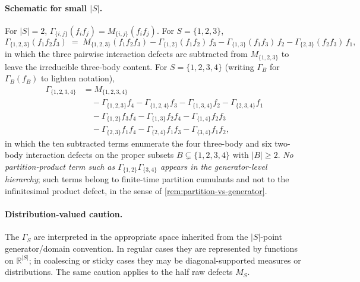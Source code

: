 \documentclass[11pt,reqno]{amsart}
\theoremstyle{plain}
\theoremstyle{definition}
\theoremstyle{remark}
\newcommand{\R}{\mathbb{R}}
\begin{document}
\paragraph{Schematic for small $|S|$.}
For $|S|=2$, $\Gamma_{\{i,j\}}(f_if_j)=M_{\{i,j\}}(f_if_j)$. For
$S=\{1,2,3\}$,
\begin{equation}\label{eq:gamma-3}
  \Gamma_{\{1,2,3\}}(f_1f_2f_3)
  \;=\;
  M_{\{1,2,3\}}(f_1f_2f_3)
  -\Gamma_{\{1,2\}}(f_1f_2)\,f_3
  -\Gamma_{\{1,3\}}(f_1f_3)\,f_2
  -\Gamma_{\{2,3\}}(f_2f_3)\,f_1,
\end{equation}
in which the three pairwise interaction defects are subtracted from
$M_{\{1,2,3\}}$ to leave the irreducible three-body content. For
$S=\{1,2,3,4\}$ (writing $\Gamma_B$ for $\Gamma_B(f_B)$ to lighten
notation),
\begin{equation}\label{eq:gamma-4}
\begin{aligned}
\Gamma_{\{1,2,3,4\}}
&=
M_{\{1,2,3,4\}}\\
&\quad
-\Gamma_{\{1,2,3\}}f_4-\Gamma_{\{1,2,4\}}f_3-\Gamma_{\{1,3,4\}}f_2-\Gamma_{\{2,3,4\}}f_1\\
&\quad
-\Gamma_{\{1,2\}}f_3f_4-\Gamma_{\{1,3\}}f_2f_4-\Gamma_{\{1,4\}}f_2f_3\\
&\quad
-\Gamma_{\{2,3\}}f_1f_4-\Gamma_{\{2,4\}}f_1f_3-\Gamma_{\{3,4\}}f_1f_2,
\end{aligned}
\end{equation}
in which the ten subtracted terms enumerate the four three-body
and six two-body interaction defects on the proper subsets
$B\subsetneq\{1,2,3,4\}$ with $|B|\ge 2$. \emph{No
partition-product term such as
$\Gamma_{\{1,2\}}\Gamma_{\{3,4\}}$ appears in the generator-level
hierarchy}; such terms belong to finite-time partition cumulants
and not to the infinitesimal product defect, in the sense of
\cref{rem:partition-vs-generator}.

\paragraph{Distribution-valued caution.}
The $\Gamma_S$ are interpreted in the appropriate space inherited
from the $|S|$-point generator/domain convention. In regular cases
they are represented by functions on $\R^{|S|}$; in coalescing or
sticky cases they may be diagonal-supported measures or
distributions. The same caution applies to the half raw defects
$M_S$.
\end{document}
